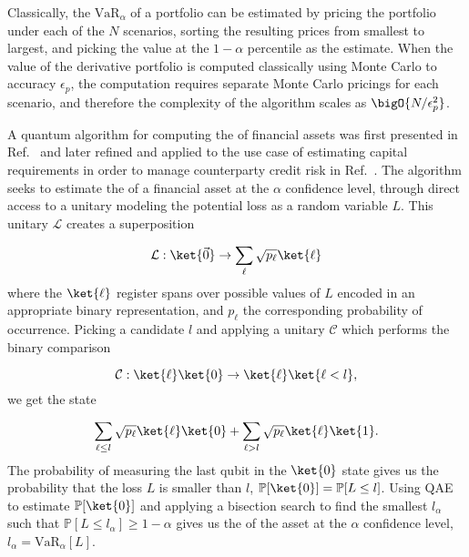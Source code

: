 \begin{enumerate}
Classically, the $\textrm{VaR}_{\alpha}$ of a portfolio can be estimated by pricing the portfolio under each of the $N$ scenarios, sorting the resulting prices from smallest to largest, and picking the value at the $1-\alpha$ percentile as the \var{} estimate.
When the value of the derivative portfolio is computed classically using Monte Carlo to accuracy $\epsilon_p$, the \var{} computation requires separate Monte Carlo pricings for each scenario, and therefore the complexity of the algorithm scales as $\bigO{N/\epsilon_p^2}$.

A quantum algorithm for computing the \var{} of financial assets was first presented in Ref.~\cite{Woerner_2019} and later refined and applied to the use case of estimating capital requirements in order to manage counterparty credit risk in Ref.~\cite{egger2019credit}.
The algorithm seeks to estimate the \var{} of a financial asset at the $\alpha$ confidence level, through direct access to a unitary modeling the potential loss as a random variable $L$.
This unitary $\mathcal{L}$ creates a superposition

\begin{equation}
	\label{eqn:loss_unitary}
	\mathcal{L} : \ket{\vec{0}} \rightarrow \sum_{\ell}\sqrt{p_{\ell}}\ket{\ell}
\end{equation}
where the $\ket{\ell}$ register spans over possible values of $L$ encoded in an appropriate binary representation, and $p_{\ell}$ the corresponding probability of occurrence.
Picking a \var{} candidate $l$ and applying a unitary $\mathcal{C}$ which performs the binary comparison

\begin{equation}
	\label{eqn:comparator}
	\mathcal{C} : \ket{\ell}\ket{0} \rightarrow \ket{\ell}\ket{\ell < l},
\end{equation}
we get the state

\begin{equation}
\sum_{\ell \le l}\sqrt{p_{\ell}}\ket{\ell}\ket{0} + \sum_{\ell>l}\sqrt{p_{\ell}}\ket{\ell}\ket{1}.
\end{equation}
The probability of measuring the last qubit in the $\ket{0}$ state gives us the probability that the loss $L$ is smaller than $l$, $\mathbb{P}[\ket{0}]=\mathbb{P}[L \le l]$.
Using QAE to estimate $\mathbb{P}[\ket{0}]$ and applying a bisection search to find the smallest $l_{\alpha}$ such that $\mathbb{P}[L \le l_{\alpha}] \ge 1-\alpha$ gives us the \var{} of the asset at the $\alpha$ confidence level, $l_{\alpha}=\textrm{VaR}_{\alpha}[L]$.


\end{enumerate}
